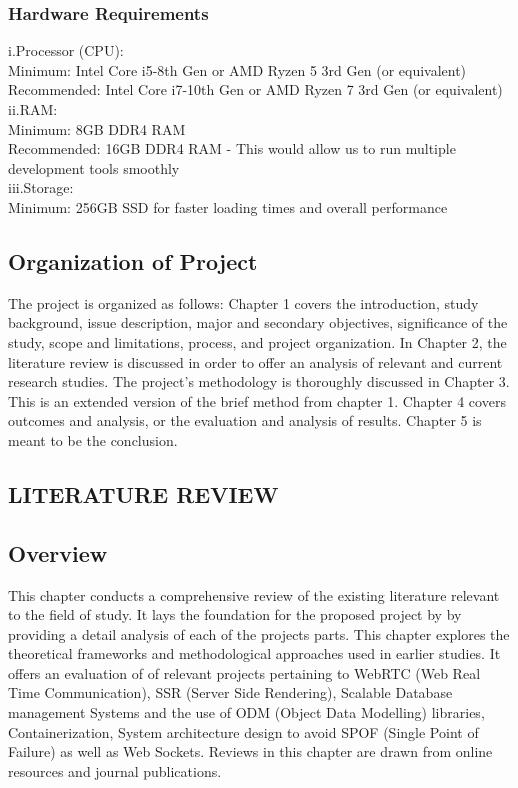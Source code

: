 \documentclass[a4paper,12pt]{article}  %
\begin{document}
\subsubsection{Hardware Requirements}
i.Processor (CPU):\\ Minimum: Intel Core i5-8th Gen or AMD Ryzen 5 3rd Gen (or
equivalent)\\ Recommended: Intel Core i7-10th Gen or AMD Ryzen 7 3rd Gen (or
equivalent)\\ ii.RAM: \\ Minimum: 8GB DDR4 RAM\\ Recommended: 16GB DDR4 RAM -
This would allow us to run multiple development tools smoothly\\ iii.Storage:\\
Minimum: 256GB SSD for faster loading times and overall performance\\

\subsection{Organization of Project}

The project is organized as follows: Chapter 1 covers the introduction, study
background, issue description, major and secondary objectives, significance of
the study, scope and limitations, process, and project organization. In Chapter
2, the literature review is discussed in order to offer an analysis of relevant
and current research studies. The project's methodology is thoroughly discussed
in Chapter 3. This is an extended version of the brief method from chapter 1.
Chapter 4 covers outcomes and analysis, or the evaluation and analysis of
results. Chapter 5 is meant to be the conclusion.\\ \newpage

\begin{center}
\section{LITERATURE REVIEW}
\end{center}
\subsection{Overview}
This chapter conducts a comprehensive review of the existing literature
relevant to the field of study. It lays the foundation for the proposed project
by by providing a detail analysis of each of the projects parts. This chapter
explores the theoretical frameworks and methodological approaches used in
earlier studies. It offers an evaluation of of relevant projects pertaining to
WebRTC (Web Real Time Communication), SSR (Server Side Rendering), Scalable
Database management Systems and the use of ODM (Object Data Modelling)
libraries, Containerization, System architecture design to avoid SPOF (Single
Point of Failure) as well as Web Sockets. Reviews in this chapter are drawn
from online resources and journal publications.\\
\end{document}

